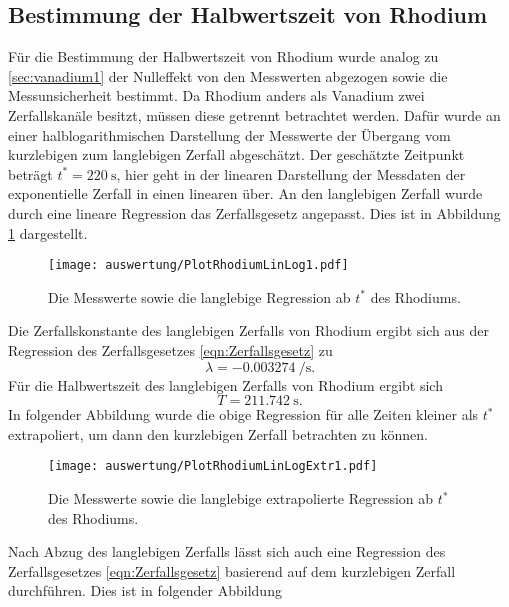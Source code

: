 \subsection{Bestimmung der Halbwertszeit von Rhodium}
  Für die Bestimmung der Halbwertszeit von Rhodium wurde analog zu \ref{sec:vanadium1} der Nulleffekt von den Messwerten abgezogen sowie die Messunsicherheit bestimmt. Da Rhodium anders als Vanadium
  zwei Zerfallskanäle besitzt, müssen diese getrennt betrachtet werden. Dafür wurde an einer halblogarithmischen Darstellung der Messwerte der Übergang vom kurzlebigen zum langlebigen Zerfall
  abgeschätzt. Der geschätzte Zeitpunkt beträgt $t^{*} = \SI{220}{\second}$, hier geht in der linearen Darstellung der Messdaten der exponentielle Zerfall in einen linearen über. An den langlebigen
  Zerfall wurde durch eine lineare Regression das Zerfallsgesetz angepasst. Dies ist in Abbildung \ref{fig:PlotRhodiumLinLog1} dargestellt.
  \begin{figure}[H]
    \centering
    \texttt{[image: auswertung/PlotRhodiumLinLog1.pdf]}
    \caption{Die Messwerte sowie die langlebige Regression ab $t^{*}$ des Rhodiums.}
    \label{fig:PlotRhodiumLinLog1}
  \end{figure}
  \noindent
  Die Zerfallskonstante des langlebigen Zerfalls von Rhodium ergibt sich aus der Regression des Zerfallsgesetzes \ref{eqn:Zerfallsgesetz} zu
  \begin{equation}
    \label{eqn:zerfallskonstanterhodiumergebnisslanglebig}
    \lambda = \SI{-0.003274}{\per\second}. %
  \end{equation}
  Für die Halbwertszeit des langlebigen Zerfalls von Rhodium ergibt sich
  \begin{equation}
    \label{eqn:halbwertszeitrhodiumergebnisslanglebig}
    T = \SI{211.742}{\second}.
  \end{equation}
  In folgender Abbildung wurde die obige Regression für alle Zeiten kleiner als $t^{*}$ extrapoliert, um dann den kurzlebigen Zerfall betrachten zu können.
  \begin{figure}[H]
    \centering
    \texttt{[image: auswertung/PlotRhodiumLinLogExtr1.pdf]}
    \caption{Die Messwerte sowie die langlebige extrapolierte Regression ab $t^{*}$ des Rhodiums.}
    \label{fig:PlotRhodiumLinLogExtr1}
  \end{figure}
  \noindent
  Nach Abzug des langlebigen Zerfalls lässt sich auch eine Regression des Zerfallsgesetzes \ref{eqn:Zerfallsgesetz} basierend auf dem kurzlebigen Zerfall durchführen. Dies ist in folgender Abbildung
